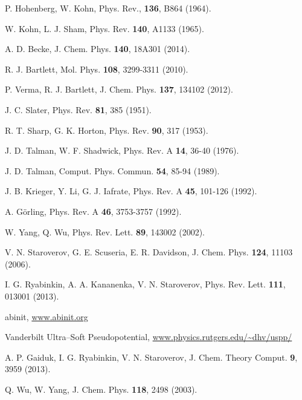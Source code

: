 
\begin{thebibliography}{9}



P. Hohenberg, W. Kohn, 
Phys. Rev., \textbf{136}, B864 (1964).

W. Kohn, L. J. Sham, 
Phys. Rev. \textbf{140}, A1133 (1965).

A. D. Becke,
J. Chem. Phys. \textbf{140}, 18A301 (2014).

R. J. Bartlett, 
Mol. Phys. \textbf{108}, 3299-3311 (2010).

P. Verma, R. J. Bartlett,
J. Chem. Phys. \textbf{137}, 134102 (2012).

J. C. Slater, 
Phys. Rev. \textbf{81}, 385 (1951).

R. T. Sharp, G. K. Horton,
Phys. Rev. \textbf{90}, 317 (1953).

J. D. Talman, W. F. Shadwick, 
Phys. Rev. A \textbf{14}, 36-40 (1976).

J. D. Talman, 
Comput. Phys. Commun. \textbf{54}, 85-94 (1989).

J. B. Krieger, Y. Li, G. J. Iafrate, 
Phys. Rev. A \textbf{45}, 101-126 (1992).

A. G\"orling,
Phys. Rev. A \textbf{46}, 3753-3757 (1992).

W. Yang, Q. Wu,
Phys. Rev. Lett. \textbf{89}, 143002 (2002).

V. N. Staroverov, G. E. Scuseria, E. R. Davidson,
J. Chem. Phys. \textbf{124}, 11103 (2006).

I. G. Ryabinkin, A. A. Kananenka, V. N. Staroverov,
Phys. Rev. Lett. \textbf{111}, 013001 (2013).

{\sc abinit},  
\url{www.abinit.org}

Vanderbilt Ultra--Soft Pseudopotential,  
\url{www.physics.rutgers.edu/~dhv/uspp/}

A. P. Gaiduk, I. G. Ryabinkin, V. N. Staroverov,
J. Chem. Theory Comput. \textbf{9}, 3959 (2013).

Q. Wu, W. Yang,
J. Chem. Phys. \textbf{118}, 2498 (2003).


\end{thebibliography}
